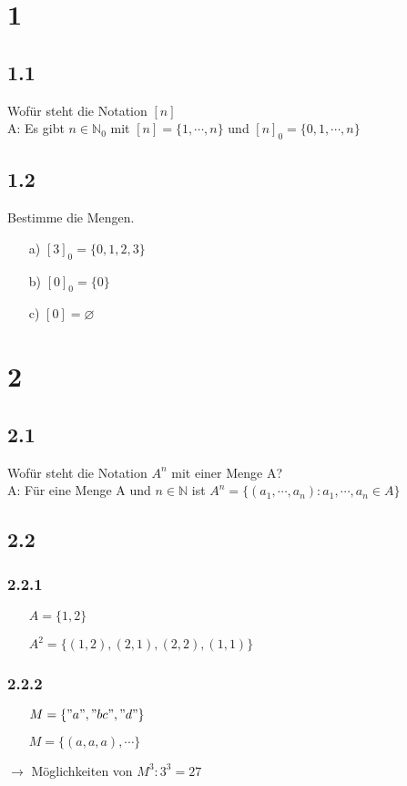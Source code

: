 \section*{1}
\subsection*{1.1}
    Wofür steht die Notation \([n]\)
    \vspace*{0.5cm}
    \\
    A: Es gibt \(n \in \mathbb{N}_0\) mit \([n] = \{1, \cdots, n\}\) und \([n]_0 = \{0, 1, \cdots, n\}\) 
\subsection*{1.2}
    Bestimme die Mengen.
    \begin{itemize}
        \item [a)]\([3]_0 = \{0, 1, 2, 3\}\)
        \item [b)]\([0]_0 = \{0\}\)
        \item [c)]\([0] = \varnothing\)
    \end{itemize}

\section*{2}
\subsection*{2.1}
Wofür steht die Notation \(A^n\) mit einer Menge A?
\vspace*{0.5cm}
\\
A: Für eine Menge A und \(n \in \mathbb{N}\) ist \(A^n = \{(a_1, \cdots, a_n) : a_1, \cdots, a_n \in A\}\)
\subsection*{2.2}
\subsubsection*{2.2.1}
    \begin{enumerate}
        \item [] \(A = \{1, 2\}\)
        \item [] \(A^2 = \{(1,2), (2,1), (2,2),(1,1)\}\)
    \end{enumerate}

\subsubsection*{2.2.2}
    \begin{enumerate}
        \item [] \(M = \{"a", "bc", "d"\}\)
        \item [] \(M = \{(a, a, a), \cdots\}\)
    \end{enumerate}
    \(\rightarrow\) Möglichkeiten von \(M^3 : 3^3 = 27\)

